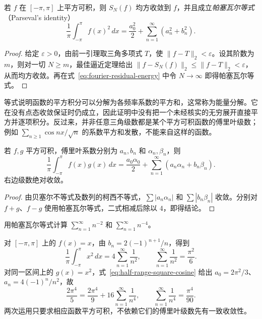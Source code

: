 \documentclass[UTF8,12pt,a4paper,fontset=fandol]{ctexbook}
\begin{document}
\begin{theorem}[傅里叶级数的均方收敛与帕塞瓦尔等式]
\label{thm:fourier-mean-square-and-parseval}
若 $f$ 在 $[-\pi,\pi]$ 上平方可积，则 $S_N(f)$ 均方收敛到 $f$，并且成立\emph{帕塞瓦尔等式}（Parseval's identity）
\begin{equation}
    \frac1\pi\int_{-\pi}^{\pi}f(x)^2\,dx
       =\frac{a_0^2}{2}+\sum_{n=1}^\infty(a_n^2+b_n^2).
    \label{eq:parseval-fourier-identity}
\end{equation}
\end{theorem}

\begin{proof}
给定 $\varepsilon>0$，由前一引理取三角多项式 $T$，使 $\|f-T\|_2<\varepsilon$。设其阶数为 $m$，则对一切 $N\geq m$，最佳逼近定理给出 $\|f-S_N(f)\|_2\leq\|f-T\|_2<\varepsilon$，从而均方收敛。再在式~\eqref{eq:fourier-residual-energy} 中令 $N\to\infty$ 即得帕塞瓦尔等式。
\end{proof}

等式说明函数的平方积分可以分解为各频率系数的平方和，这常称为能量分解。它在没有点态收敛保证时仍成立，因此证明中没有把一个未经核实的无穷展开直接平方并逐项积分。反过来，并非任意三角级数都是某个平方可积函数的傅里叶级数；例如 $\sum_{n\geq1}\cos nx/\sqrt n$ 的系数平方和发散，不能来自这样的函数。

\begin{corollary}[广义帕塞瓦尔等式]
\label{cor:generalized-parseval-fourier}
若 $f,g$ 平方可积，傅里叶系数分别为 $a_n,b_n$ 和 $\alpha_n,\beta_n$，则
\begin{equation}
    \frac1\pi\int_{-\pi}^{\pi}f(x)g(x)\,dx
       =\frac{a_0\alpha_0}{2}
            +\sum_{n=1}^\infty(a_n\alpha_n+b_n\beta_n).
    \label{eq:generalized-parseval-fourier}
\end{equation}
右边级数绝对收敛。
\end{corollary}

\begin{proof}
由贝塞尔不等式及数列的柯西不等式，$\sum|a_n\alpha_n|$ 和 $\sum|b_n\beta_n|$ 收敛。分别对 $f+g$、$f-g$ 使用帕塞瓦尔等式，二式相减后除以 $4$，即得结论。
\end{proof}

\begin{example}
\label{ex:parseval-sums-second-fourth-powers}
用帕塞瓦尔等式计算 $\sum_{n=1}^\infty n^{-2}$ 和 $\sum_{n=1}^\infty n^{-4}$。
\end{example}

\begin{solve}
对 $[-\pi,\pi]$ 上的 $f(x)=x$，由 $b_n=2(-1)^{n+1}/n$，得到
\[
    \frac1\pi\int_{-\pi}^{\pi}x^2\,dx
       =4\sum_{n=1}^\infty\frac1{n^2},
    \qquad \sum_{n=1}^\infty\frac1{n^2}=\frac{\pi^2}{6}.
\]
对同一区间上的 $g(x)=x^2$，式~\eqref{eq:half-range-square-cosine} 给出 $a_0=2\pi^2/3$、$a_n=4(-1)^n/n^2$，故
\[
    \frac{2\pi^4}{5}=\frac{2\pi^4}{9}
                   +16\sum_{n=1}^\infty\frac1{n^4},
    \qquad \sum_{n=1}^\infty\frac1{n^4}=\frac{\pi^4}{90}.
\]
两次运用只要求相应函数平方可积，不依赖它们的傅里叶级数先有一致收敛性。
\end{solve}
\end{document}
